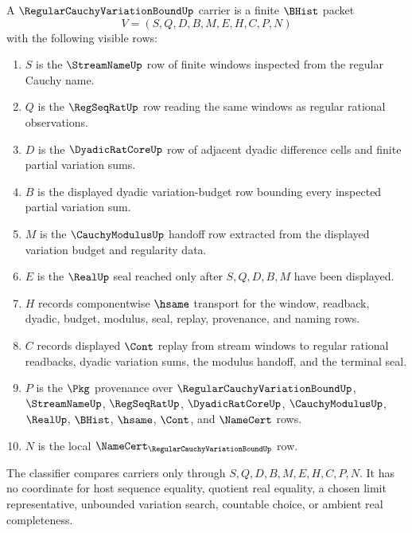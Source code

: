 \begin{definition}
\label{def:regular-cauchy-variation-bound-carrier}
A $\RegularCauchyVariationBoundUp$ carrier is a finite $\BHist$ packet
$$
V=(S,Q,D,B,M,E,H,C,P,N)
$$
with the following visible rows:
\begin{enumerate}
\item $S$ is the $\StreamNameUp$ row of finite windows inspected from the regular Cauchy name.
\item $Q$ is the $\RegSeqRatUp$ row reading the same windows as regular rational observations.
\item $D$ is the $\DyadicRatCoreUp$ row of adjacent dyadic difference cells and finite partial variation sums.
\item $B$ is the displayed dyadic variation-budget row bounding every inspected partial variation sum.
\item $M$ is the $\CauchyModulusUp$ handoff row extracted from the displayed variation budget and regularity data.
\item $E$ is the $\RealUp$ seal reached only after $S,Q,D,B,M$ have been displayed.
\item $H$ records componentwise $\hsame$ transport for the window, readback, dyadic, budget, modulus, seal, replay, provenance, and naming rows.
\item $C$ records displayed $\Cont$ replay from stream windows to regular rational readbacks, dyadic variation sums, the modulus handoff, and the terminal seal.
\item $P$ is the $\Pkg$ provenance over $\RegularCauchyVariationBoundUp$, $\StreamNameUp$, $\RegSeqRatUp$, $\DyadicRatCoreUp$, $\CauchyModulusUp$, $\RealUp$, $\BHist$, $\hsame$, $\Cont$, and $\NameCert$ rows.
\item $N$ is the local $\NameCert_{\RegularCauchyVariationBoundUp}$ row.
\end{enumerate}
The classifier compares carriers only through $S,Q,D,B,M,E,H,C,P,N$. It has no coordinate for host sequence equality, quotient real equality, a chosen limit representative, unbounded variation search, countable choice, or ambient real completeness.
\end{definition}

